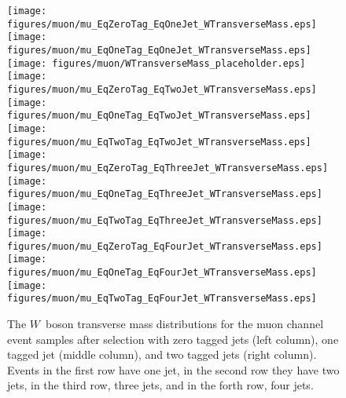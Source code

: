 \begin{figure}[!h!tbp]
\texttt{[image: figures/muon/mu\_EqZeroTag\_EqOneJet\_WTransverseMass.eps]}  
\texttt{[image: figures/muon/mu\_EqOneTag\_EqOneJet\_WTransverseMass.eps]}   
\texttt{[image: figures/muon/WTransverseMass\_placeholder.eps]}            
\texttt{[image: figures/muon/mu\_EqZeroTag\_EqTwoJet\_WTransverseMass.eps]}  
\texttt{[image: figures/muon/mu\_EqOneTag\_EqTwoJet\_WTransverseMass.eps]}   
\texttt{[image: figures/muon/mu\_EqTwoTag\_EqTwoJet\_WTransverseMass.eps]}   
\texttt{[image: figures/muon/mu\_EqZeroTag\_EqThreeJet\_WTransverseMass.eps]}
\texttt{[image: figures/muon/mu\_EqOneTag\_EqThreeJet\_WTransverseMass.eps]} 
\texttt{[image: figures/muon/mu\_EqTwoTag\_EqThreeJet\_WTransverseMass.eps]} 
\texttt{[image: figures/muon/mu\_EqZeroTag\_EqFourJet\_WTransverseMass.eps]} 
\texttt{[image: figures/muon/mu\_EqOneTag\_EqFourJet\_WTransverseMass.eps]}  
\texttt{[image: figures/muon/mu\_EqTwoTag\_EqFourJet\_WTransverseMass.eps]}  
\vspace{-0.1in}
\caption[MTWmuon]{The $W$~boson transverse mass distributions for
the muon channel event samples after selection with zero tagged
jets (left column), one tagged jet (middle column), and two tagged
jets (right column). Events in the first row have one jet, in the
second row they have two jets, in the third row, three jets, and in
the forth row, four jets.}
\label{MTW-muon}
\end{figure}
